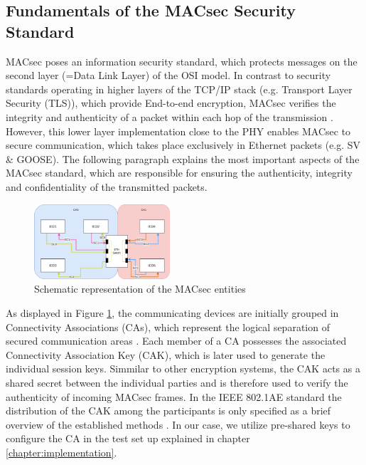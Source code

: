 \documentclass[conference, onecolumn, a4paper]{IEEEtran}
\begin{document}
\subsection{Fundamentals of the MACsec Security Standard}
\noindent MACsec poses an information security standard, which protects messages on the second layer (=Data Link Layer) of the OSI model. In contrast 
to security standards operating in higher layers of the TCP/IP stack (e.g. Transport Layer Security (TLS)), which provide End-to-end encryption, MACsec 
verifies the integrity and authenticity of a packet within each hop of the transmission \cite{Cybersecurity_Substation:2016}. However, this lower layer 
implementation close to the PHY enables MACsec to secure communication, which takes place exclusively in Ethernet packets (e.g. SV \& GOOSE). The 
following paragraph explains the most important aspects of the MACsec standard, which are responsible for ensuring the authenticity, integrity and 
confidentiality of the transmitted packets.

\begin{figure}[h]
    \centering
    \includegraphics[width=0.45\textwidth]{images/MACsec_Entities_Diagram.png}
    \caption{Schematic representation of the MACsec entities \cite{IEEE-802-1AE:2018}}
    \label{image:MACsecEntities}
\end{figure}

\noindent As displayed in Figure \ref{image:MACsecEntities}, the communicating devices are initially grouped in Connectivity Associations (CAs), which 
represent the logical separation of secured communication areas \cite[p. 35]{IEEE-802-1AE:2018}. Each member of a CA possesses the associated Connectivity 
Association Key (CAK), which is later used to generate the individual session keys. Simmilar to other encryption systems, the CAK acts as a shared 
secret between the individual parties and is therefore used to verify the authenticity of incoming MACsec frames. In the IEEE 802.1AE standard the 
distribution of the CAK among the participants is only specified as a brief overview of the established methods \cite[p. 230]{IEEE-802-1AE:2018}. 
In our case, we utilize pre-shared keys to configure the CA in the test set up explained in chapter \ref{chapter:implementation}.
\end{document}
